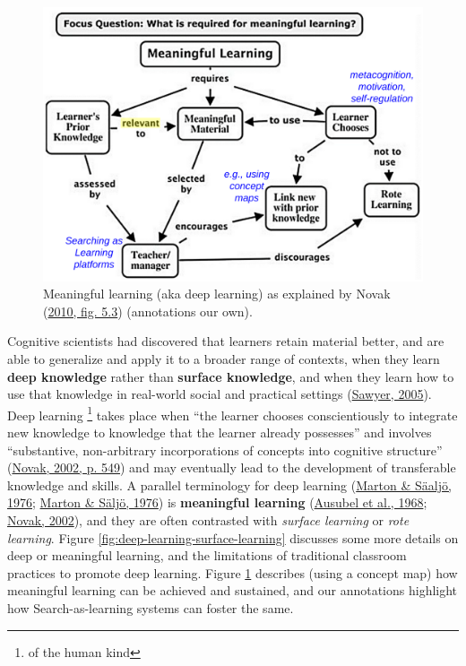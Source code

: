 \documentclass[letterpaper, nobind]{templates/ociamthesis}
\begin{document}
\begin{figure}

{\centering \includegraphics[width=0.7\linewidth]{figs/meaningful-learning} 

}

\caption[Meaningful learning.]{Meaningful learning (aka deep learning) as explained by Novak (\protect\hyperlink{ref-novak2010learninga}{2010, fig. 5.3}) (annotations our own).}\label{fig:meaningful-learning}
\end{figure}





Cognitive scientists had discovered that learners retain material
better, and are able to generalize and apply it to a broader range of
contexts, when they learn \textbf{deep knowledge} rather than \textbf{surface
knowledge}, and when they learn how to use that knowledge in real-world
social and practical settings (\protect\hyperlink{ref-sawyer2005cambridge}{Sawyer, 2005}). Deep learning \footnote{of the human kind} takes place when ``the learner chooses conscientiously to integrate new
knowledge to knowledge that the learner already possesses'' and involves
``substantive, non-arbitrary incorporations of concepts into cognitive
structure'' (\protect\hyperlink{ref-novak2002meaningful}{Novak, 2002, p. 549}) and may eventually lead to the
development of transferable knowledge and skills. A parallel terminology
for deep learning (\protect\hyperlink{ref-marton1976qualitative-b}{Marton \& Säaljö, 1976}; \protect\hyperlink{ref-marton1976qualitative-a}{Marton \& Säljö, 1976})
is \textbf{meaningful learning}
(\protect\hyperlink{ref-ausubel1968educational}{Ausubel et al., 1968}; \protect\hyperlink{ref-novak2002meaningful}{Novak, 2002}), and they are often
contrasted with \emph{surface learning} or \emph{rote learning}.
Figure \ref{fig:deep-learning-surface-learning} discusses some more details on deep or meaningful learning, and the limitations of traditional classroom practices to promote deep learning.
Figure \ref{fig:meaningful-learning} describes (using a concept map) how meaningful learning can be achieved and sustained, and our annotations highlight how Search-as-learning systems can foster the same.
\end{document}
